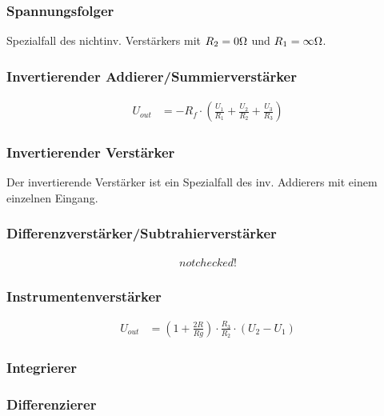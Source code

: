 \subsubsection{Spannungsfolger}

Spezialfall des nichtinv. Verstärkers mit $R_2 = 0\ohm$ und $R_1 = \infty\ohm$.


\subsubsection{Invertierender Addierer/Summierverstärker}

	\resizebox{6cm}{!}{
		
	}
	
	\begin{emphbox}
		\begin{align*}
			U_{out} &= -R_f \cdot (\frac{U_1}{R_1} + \frac{U_2}{R_2} + \frac{U_3}{R_3})
		\end{align*}
	\end{emphbox}

\subsubsection{Invertierender Verstärker}

Der invertierende Verstärker ist ein Spezialfall des inv. Addierers mit einem einzelnen Eingang.

\subsubsection{Differenzverstärker/Subtrahierverstärker}

	\resizebox{6cm}{!}{
		
	}

	\begin{emphbox}
		\begin{align*}
			not checked!
		\end{align*}
	\end{emphbox}

\subsubsection{Instrumentenverstärker}
	\resizebox{6cm}{!}{
		
	}
	\begin{emphbox}
		\begin{align*}
			U_{out} &= (1+\frac{2R}{Rg}) \cdot \frac{R_3}{R_2} \cdot (U_2-U_1)
		\end{align*}
	\end{emphbox}
\subsubsection{Integrierer}
\subsubsection{Differenzierer}
